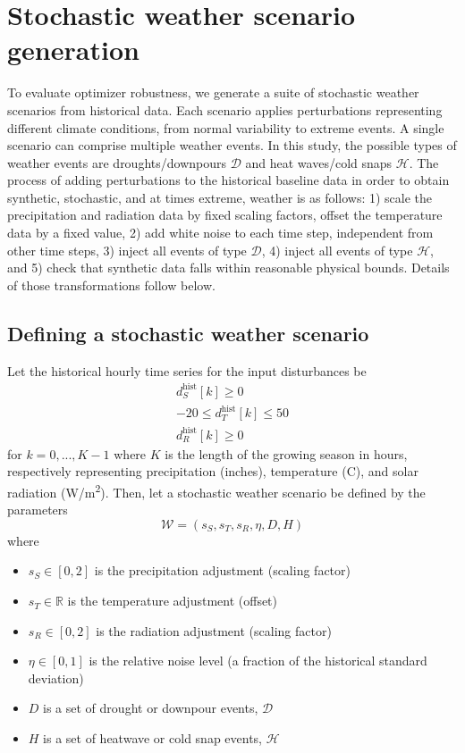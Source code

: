 \documentclass[preprint,12pt]{elsarticle}
\begin{document}
\section{Stochastic weather scenario generation}\label{sec:weather}

To evaluate optimizer robustness, we generate a suite of stochastic weather scenarios from historical data. Each scenario applies perturbations representing different climate conditions, from normal variability to extreme events. A single scenario can comprise multiple weather events. In this study, the possible types of weather events are droughts/downpours $\mathcal{D}$ and heat waves/cold snaps $\mathcal{H}$. The process of adding perturbations to the historical baseline data in order to obtain synthetic, stochastic, and at times extreme, weather is as follows: 1) scale the precipitation and radiation data by fixed scaling factors, offset the temperature data by a fixed value, 2) add white noise to each time step, independent from other time steps, 3) inject all events of type $\mathcal{D}$, 4) inject all events of type $\mathcal{H}$, and 5) check that synthetic data falls within reasonable physical bounds. Details of those transformations follow below.

\subsection{Defining a stochastic weather scenario}\label{subsec:weather-generation}

Let the historical hourly time series for the input disturbances be
\begin{gather}
d_{S}^{\text{hist}}[k] \geq 0           \\
-20 \leq d_{T}^{\text{hist}}[k] \leq 50 \\
d_{R}^{\text{hist}}[k] \geq 0
\label{eqn:history}
\end{gather}
for $k=0,...,K-1$ where $K$ is the length of the growing season in hours, respectively representing precipitation (inches), temperature (\textdegree C), and solar radiation (W/m\textsuperscript{2}). Then, let a stochastic weather scenario be defined by the parameters
\begin{equation}
\mathcal{W} = (s_{S}, s_{T}, s_{R}, \eta, D, H)
\label{eqn:weather-scenario}
\end{equation}
where
\begin{itemize}
\item $s_{S} \in [0, 2]$ is the precipitation adjustment (scaling factor)
\item $s_{T} \in \mathbb{R}$ is the temperature adjustment (offset)
\item $s_{R} \in [0, 2]$ is the radiation adjustment (scaling factor)
\item $\eta \in [0, 1]$ is the relative noise level (a fraction of the historical standard deviation)
\item $D$ is a set of drought or downpour events, $\mathcal{D}$
\item $H$ is a set of heatwave or cold snap events, $\mathcal{H}$
\end{itemize}
\end{document}
